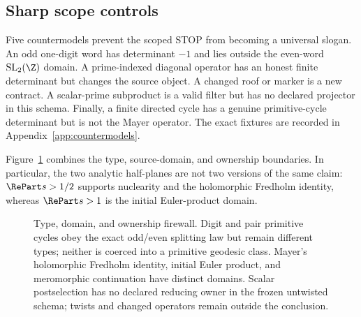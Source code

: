 \subsection{Sharp scope controls}

Five countermodels prevent the scoped STOP from becoming a universal slogan.
An odd one-digit word has determinant $-1$ and lies outside the even-word
$\mathrm{SL}_2(\Z)$ domain.  A prime-indexed diagonal operator has an honest
finite determinant but changes the source object.  A changed roof or marker
is a new contract.  A scalar-prime subproduct is a valid filter but has no
declared projector in this schema.  Finally, a finite directed cycle has a
genuine primitive-cycle determinant but is not the Mayer operator.  The exact
fixtures are recorded in Appendix~\ref{app:countermodels}.

Figure~\ref{fig:type-owner} combines the type, source-domain, and ownership
boundaries.  In particular, the two analytic half-planes are not two versions
of the same claim: $\RePart s>1/2$ supports nuclearity and the holomorphic
Fredholm identity, whereas $\RePart s>1$ is the initial Euler-product domain.

\begin{figure}[t]
  \centering
  \resizebox{\textwidth}{!}{}
  \caption{Type, domain, and ownership firewall.  Digit and pair primitive
  cycles obey the exact odd/even splitting law but remain different types;
  neither is coerced into a primitive geodesic class.  Mayer's holomorphic
  Fredholm identity, initial Euler product, and meromorphic continuation have
  distinct domains.  Scalar postselection has no declared reducing owner in
  the frozen untwisted schema; twists and changed operators remain outside
  the conclusion.}
  \label{fig:type-owner}
\end{figure}
